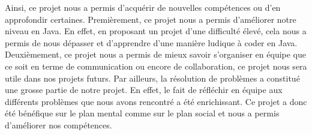 \documentclass[12pt]{article}
\begin{document}
Ainsi, ce projet nous a permis d'acquérir de nouvelles compétences ou d'en approfondir certaines. Premièrement, ce projet nous a permis d'améliorer notre niveau en Java. En effet, en proposant un projet d'une difficulté élevé, cela nous a permis de nous dépasser et d'apprendre d'une manière ludique à coder en Java. Deuxièmement, ce projet nous a permis de mieux savoir s'organiser en équipe que ce soit en terme de communication ou encore de collaboration, ce projet nous sera utile dans nos projets futurs. Par ailleurs, la résolution de problèmes a constitué une grosse partie de notre projet. En effet, le fait de réfléchir en équipe aux différents problèmes que nous avons rencontré a été enrichissant. Ce projet a donc été bénéfique sur le plan mental comme sur le plan social et nous a permis d'améliorer nos compétences. 
\end{document}
